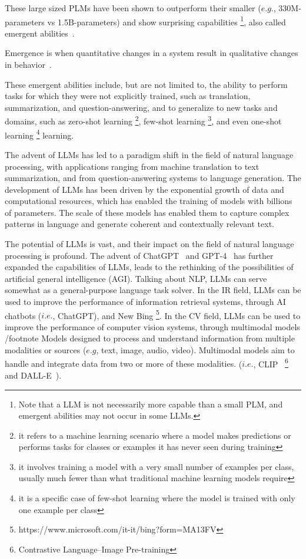 \begin{enumerate}
{\begin{itemize}
        \end{itemize}
        These large sized PLMs have been shown to outperform their smaller ($e.g.$, 330M-parameters vs 1.5B-parameters) and show surprising capabilities \footnote{Note that a LLM is not necessarily more capable than a small PLM, and emergent abilities may not occur in some LLMs.}, also called emergent abilities~\cite{emergent2}.
        \begin{displayquote}
            Emergence is when quantitative changes in a system result in qualitative changes in behavior~\cite{emergent1}.
        \end{displayquote}
        These emergent abilities include, but are not limited to, the ability to perform tasks for which they were not explicitly trained, such as translation, summarization, and question-answering, and to generalize to new tasks and domains, such as zero-shot learning \footnote{it refers to a machine learning scenario where a model makes predictions or performs tasks for classes or examples it has never seen during training}, few-shot learning \footnote{it involves training a model with a very small number of examples per class, usually much fewer than what traditional machine learning models require}, and even one-shot learning \footnote{it is a specific case of few-shot learning where the model is trained with only one example per class} learning.
    }
\end{enumerate}
The advent of LLMs has led to a paradigm shift in the field of natural language processing, with applications ranging from machine translation to text summarization, and from question-answering systems to language generation.
The development of LLMs has been driven by the exponential growth of data and computational resources, which has enabled the training of models with billions of parameters.
The scale of these models has enabled them to capture complex patterns in language and generate coherent and contextually relevant text.

The potential of LLMs is vast, and their impact on the field of natural language processing is profound.
The advent of ChatGPT~\cite{chatgpt} and GPT-4~\cite{gpt4} has further expanded the capabilities of LLMs, leads to the rethinking of the possibilities of artificial general intelligence (AGI).
Talking about NLP, LLMs can serve somewhat as a general-purpose language task solver.
In the IR field, LLMs can be used to improve the performance of information retrieval systems, through AI chatbots ($i.e.$, ChatGPT), and New Bing \footnote{https://www.microsoft.com/it-it/bing?form=MA13FV}.
In the CV field, LLMs can be used to improve the performance of computer vision systems, through multimodal models /footnote{
    Models designed to process and understand information from multiple modalities or sources ($e.g$, text, image, audio, video).
    Multimodal models aim to handle and integrate data from two or more of these modalities.
} ($i.e.$, CLIP~\cite{clip} \footnote{Contrastive Language–Image Pre-training} and DALL-E~\cite{dall-e}).

